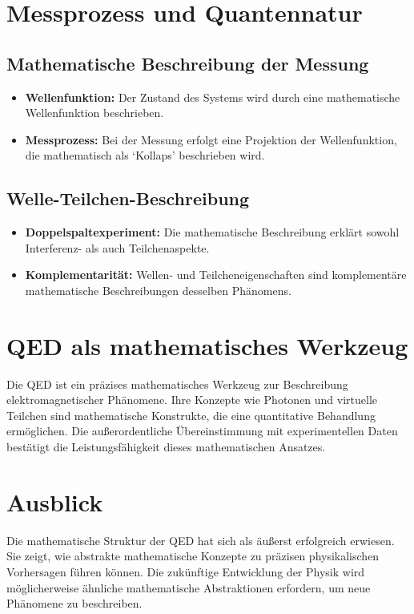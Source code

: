 \documentclass[12pt,a4paper]{article}
\begin{document}
\section{Messprozess und Quantennatur}
\subsection{Mathematische Beschreibung der Messung}
\begin{itemize}
\item \textbf{Wellenfunktion:} Der Zustand des Systems wird durch eine mathematische Wellenfunktion beschrieben.
\item \textbf{Messprozess:} Bei der Messung erfolgt eine Projektion der Wellenfunktion, die mathematisch als `Kollaps' beschrieben wird.
\end{itemize}

\subsection{Welle-Teilchen-Beschreibung}
\begin{itemize}
\item \textbf{Doppelspaltexperiment:} Die mathematische Beschreibung erklärt sowohl Interferenz- als auch Teilchenaspekte.
\item \textbf{Komplementarität:} Wellen- und Teilcheneigenschaften sind komplementäre mathematische Beschreibungen desselben Phänomens.
\end{itemize}

\section{QED als mathematisches Werkzeug}
Die QED ist ein präzises mathematisches Werkzeug zur Beschreibung elektromagnetischer Phänomene. Ihre Konzepte wie Photonen und virtuelle Teilchen sind mathematische Konstrukte, die eine quantitative Behandlung ermöglichen. Die außerordentliche Übereinstimmung mit experimentellen Daten bestätigt die Leistungsfähigkeit dieses mathematischen Ansatzes.

\section{Ausblick}
Die mathematische Struktur der QED hat sich als äußerst erfolgreich erwiesen. Sie zeigt, wie abstrakte mathematische Konzepte zu präzisen physikalischen Vorhersagen führen können. Die zukünftige Entwicklung der Physik wird möglicherweise ähnliche mathematische Abstraktionen erfordern, um neue Phänomene zu beschreiben.
\end{document}
